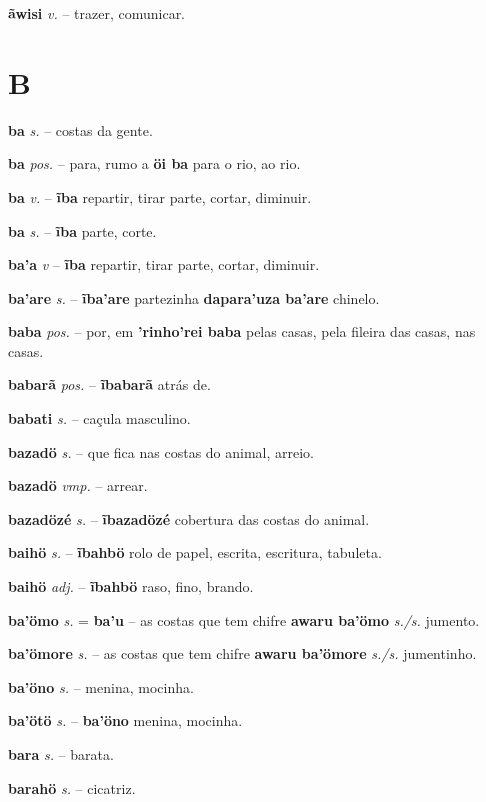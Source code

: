 \textbf{ãwisi} \textit{v.} -- trazer, comunicar.



\section*{B}


\textbf{ba} \textit{s.} -- costas da gente.

\textbf{ba} \textit{pos.} -- para, rumo a  \textbf{öi ba} para o rio, ao rio.

\textbf{ba} \textit{v.} -- \textbf{ĩba} repartir, tirar parte, cortar, diminuir.

\textbf{ba} \textit{s.} -- \textbf{ĩba} parte, corte.

\textbf{ba'a} \textit{v} -- \textbf{ĩba} repartir, tirar parte, cortar, diminuir.

\textbf{ba'are} \textit{s.} -- \textbf{ĩba'are} partezinha  \textbf{dapara'uza ba'are} chinelo.

\textbf{baba} \textit{pos.} -- por, em  \textbf{'rinho'rei baba} pelas casas, pela fileira das casas, nas casas.

\textbf{babarã} \textit{pos.} -- \textbf{ĩbabarã} atrás de.

\textbf{babati} \textit{s.} -- caçula masculino.

\textbf{bazadö} \textit{s.} -- que fica nas costas do animal, arreio.

\textbf{bazadö} \textit{vmp.} -- arrear.

\textbf{bazadözé} \textit{s.} -- \textbf{ĩbazadözé} cobertura das costas do animal.

\textbf{baihö} \textit{s.} -- \textbf{ĩbahbö} rolo de papel, escrita, escritura, tabuleta.

\textbf{baihö} \textit{adj.} -- \textbf{ĩbahbö} raso, fino, brando.

\textbf{ba'ömo} \textit{s.} = \textbf{ba'u} -- as costas que tem chifre  \textbf{awaru ba'ömo} \textit{s./s.} jumento.

\textbf{ba'ömore} \textit{s.} -- as costas que tem chifre  \textbf{awaru ba'ömore} \textit{s./s.} jumentinho.

\textbf{ba'öno} \textit{s.} -- menina, mocinha.

\textbf{ba'ötö} \textit{s.} -- \textbf{ba'öno} menina, mocinha.

\textbf{bara} \textit{s.} -- barata.

\textbf{barahö} \textit{s.} -- cicatriz.


